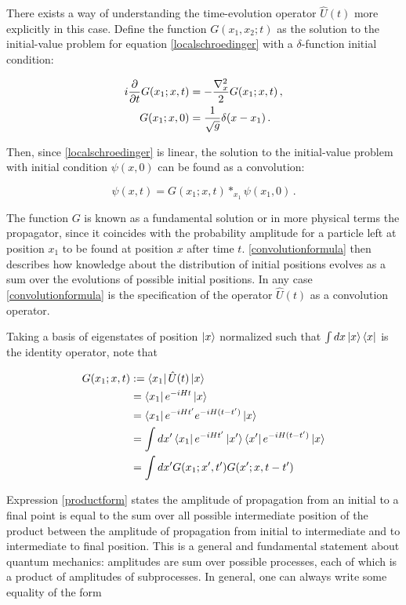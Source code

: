 \documentclass{article}
\begin{document}
There exists a way of understanding the time-evolution operator $\hat U(t)$ more explicitly in this case. Define the function $G(x_1,x_2;t)$ as the solution to the initial-value problem for equation \eqref{localschroedinger} with a $\delta$-function initial condition:

\begin{align}
    i \pdv{t} G(x_1;x,t) & = - \frac{\nabla^2_x}{2} G(x_1;x,t)\,, \\
    G(x_1;x,0) & = \frac{1}{\sqrt{g}} \delta(x-x_1)\,.
\end{align}

Then, since \eqref{localschroedinger} is linear, the solution to the initial-value problem with initial condition $\psi(x,0)$ can be found as a convolution:

\begin{equation}\label{convolutionformula}
    \psi(x,t) = G(x_1;x,t) \ast_{x_1} \psi(x_1,0)\,.
\end{equation}

The function $G$ is known as a fundamental solution or in more physical terms the propagator, since it coincides with the probability amplitude for a particle left at position $x_1$ to be found at position $x$ after time $t$. \eqref{convolutionformula} then describes how knowledge about the distribution of initial positions evolves as a sum over the evolutions of possible initial positions. In any case \eqref{convolutionformula} is the specification of the operator $\hat U(t)$ as a convolution operator.

Taking a basis of eigenstates of position $\ket x$ normalized such that $\int dx \ket{x} \bra{x}$ is the identity operator, note that

\begin{align}
    G(x_1;x,t) & := \bra{x_1} \hat U (t) \ket{x}\\
    & = \bra{x_1} e^{-i H t} \ket{x} \\
    & = \bra{x_1} e^{-i H t'} e^{-i H (t-t')} \ket{x} \\
    & = \int dx' \bra{x_1} e^{-i H t'} \ket{x'} \bra{x'} e^{-iH(t-t')} \ket{x}\\
    & = \int dx' G(x_1;x',t')G(x';x,t-t') \label{productform}
\end{align}

Expression \eqref{productform} states the amplitude of propagation from an initial to a final point is equal to the sum over all possible intermediate position of the product between the amplitude of propagation from initial to intermediate and to intermediate to final position. This is a general and fundamental statement about quantum mechanics: amplitudes are sum over possible processes, each of which is a product of amplitudes of subprocesses. In general, one can always write some equality of the form
\end{document}
